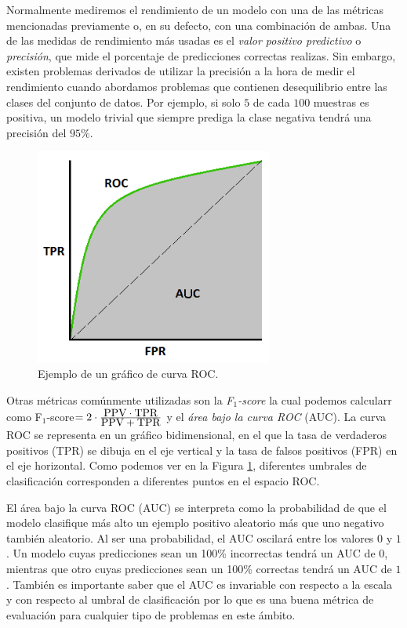 \documentclass[oneside,openright,titlepage,numbers=noenddot,openany,headinclude,footinclude=true,
cleardoublepage=empty,abstractoff,BCOR=5mm,paper=a4,fontsize=12pt,main=spanish]{scrreprt}
\begin{document}
\clearpage

Normalmente mediremos el rendimiento de un modelo con una de las métricas mencionadas previamente o, en su defecto, con una combinación de ambas. Una de las medidas de rendimiento más usadas es el \textit{valor positivo predictivo} o \textit{precisión}, que mide el porcentaje de predicciones correctas realizas. Sin embargo, existen problemas derivados de utilizar la precisión a la hora de medir el rendimiento cuando abordamos problemas que contienen desequilibrio entre las clases del conjunto de datos. Por ejemplo, si solo $5$ de cada $100$ muestras es positiva, un modelo trivial que siempre prediga la clase negativa tendrá una precisión del $95\%$.\\

\begin{figure}[h]
	\centering
	\includegraphics[width=7.8cm]{ROC_curve.png}
	\caption{Ejemplo de un gráfico de curva ROC.}
    \label{fig:curvaROC}
\end{figure}

Otras métricas comúnmente utilizadas son la \textit{F$_1$-score} la cual podemos calcularr como F$_1$-score$=2 \cdot \frac{\displaystyle \text{PPV}\cdot \text{TPR}}{\displaystyle \text{PPV}+\text{TPR}}$ y el \textit{área bajo la curva ROC} (AUC). La curva ROC se representa en
un gráfico bidimensional, en el que la tasa de verdaderos positivos (TPR) se dibuja en el eje vertical y la tasa de falsos positivos (FPR) en el eje horizontal. Como podemos ver en la Figura \ref{fig:curvaROC}, diferentes umbrales de clasificación corresponden a diferentes puntos en el espacio ROC.  

El área bajo la curva ROC (AUC) se interpreta como la probabilidad de que el modelo clasifique más alto un ejemplo positivo aleatorio más que uno negativo también aleatorio. Al ser una probabilidad, el AUC oscilará entre los valores $0$ y $1$. Un modelo cuyas predicciones sean un 100\% incorrectas tendrá un AUC de $0$, mientras que otro cuyas predicciones sean un 100\% correctas tendrá un AUC de $1$. También es importante saber que el AUC es invariable con respecto a la escala y con respecto al umbral de clasificación por lo que es una buena métrica de evaluación para cualquier tipo de problemas en este ámbito.
\end{document}
